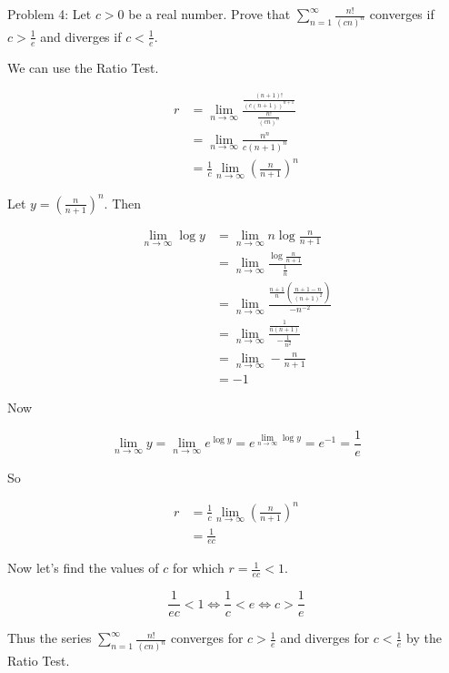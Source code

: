 Problem 4: Let $c > 0$ be a real number. Prove that $\displaystyle \sum_{n=1}^\infty \frac{n!}{(cn)^n}$ converges if $c > \frac{1}{e}$ and diverges if $c < \frac{1}{e}$.

We can use the Ratio Test.

\begin{align*}
r &= \lim_{n \rightarrow \infty} \frac{\frac{(n+1)!}{(c(n+1))^{n+1}}}{\frac{n!}{(cn)^{n}}} \\
&= \lim_{n \rightarrow \infty} \frac{n^n}{c(n+1)^{n}} \\
&= \frac{1}{c} \lim_{n \rightarrow \infty} \left(\frac{n}{n+1}\right)^n
\end{align*}

Let $y = \left(\frac{n}{n+1}\right)^n$. Then

\begin{align*}
\lim_{n \rightarrow \infty} \log y &= \lim_{n \rightarrow \infty} n \log{\frac{n}{n+1}} \\
&= \lim_{n \rightarrow \infty} \frac{\log{\frac{n}{n+1}}}{\frac{1}{n}} \\
&= \lim_{n \rightarrow \infty} \frac{\frac{n+1}{n} \left(\frac{n+1 - n}{(n+1)^2}\right)}{-n^{-2}} \\
&= \lim_{n \rightarrow \infty} \frac{\frac{1}{n(n+1)}}{-\frac{1}{n^2}} \\
&= \lim_{n \rightarrow \infty} - \frac{n}{n+1} \\
&= -1
\end{align*}

Now

$$ \lim_{n \rightarrow \infty} y = \lim_{n \rightarrow \infty} e^{\log y} = e^{\lim_{n \rightarrow \infty} \log y} = e^{-1} = \frac{1}{e} $$

So

\begin{align*}
r &= \frac{1}{c} \lim_{n \rightarrow \infty} \left(\frac{n}{n+1}\right)^n \\
&= \frac{1}{ec}
\end{align*}

Now let's find the values of $c$ for which $\displaystyle r = \frac{1}{ec} < 1$.

$$ \frac{1}{ec} < 1 \iff \frac{1}{c} < e \iff c > \frac{1}{e} $$

Thus the series $\displaystyle \sum_{n=1}^{\infty} \frac{n!}{(cn)^n}$ converges for $\displaystyle c > \frac{1}{e}$ and diverges for $\displaystyle c < \frac{1}{e}$ by the Ratio Test.
